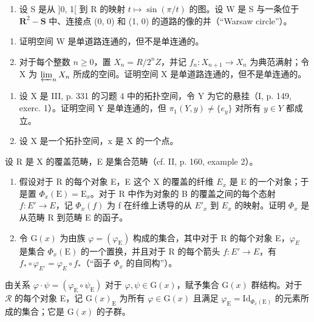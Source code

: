\exercisegroup

\begin{enumerate}
\def\labelenumi{\arabic{enumi})}
\tightlist
\item
设 S 是从 ]0, 1[ 到 R 的映射 \(t \mapsto \sin(\pi/t)\) 的图。设 W 是 S 与一条位于 \(\mathbf{R}^2 - \mathbf{S}\) 中、连接点 (0, 0) 和 (1, 0) 的道路的像的并（“Warsaw circle”）。
\end{enumerate}

\begin{enumerate}
\def\labelenumi{\alph{enumi})}
\item
证明空间 W 是单道路连通的，但不是单连通的。
\item
对于每个整数 \(n \geqslant 0\)，置 \(X_{n} = R/2^{n}Z\)，并记 \(f_{n}: X_{n+1} \to X_{n}\) 为典范满射；令 X 为 \(\varprojlim_{n} X_{n}\) 所成的空间。证明空间 X 是单道路连通的，但不是单连通的。
\end{enumerate}

\begin{enumerate}
\def\labelenumi{\arabic{enumi})}
\setcounter{enumi}{1}
\item
设 X 是 III, p. 331 的习题 4 中的拓扑空间，令 Y 为它的悬挂（I, p. 149, exerc. 1）。证明空间 Y 是单连通的，但 \(\pi_1(Y, y) \neq \{e_y\}\) 对所有 \(y \in Y\) 都成立。
\item
设 X 是一个拓扑空间，x 是 X 的一个点。
\end{enumerate}

设 R 是 X 的覆盖范畴，E 是集合范畴（cf. II, p. 160, example 2）。

\begin{enumerate}
\def\labelenumi{\alph{enumi})}
\item
假设对于 R 的每个对象 E，E 这个 X 的覆盖的纤维 \(E_{x}\) 是 E 的一个对象；于是置 \(\Phi_{x}(\mathrm{E}) = \mathrm{E}_{x}\)。对于 R 中作为对象的 B 的覆盖之间的每个态射 \(f: E' \to E\)，记 \(\Phi_{x}(f)\) 为 f 在纤维上诱导的从 \(E'_{x}\) 到 \(E_{x}\) 的映射。证明 \(\Phi_{x}\) 是从范畴 R 到范畴 E 的函子。
\item
令 \(\mathrm{G}(x)\) 为由族 \(\varphi = (\varphi_{\mathrm{E}})\) 构成的集合，其中对于 R 的每个对象 E，\(\varphi_{E}\) 是集合 \(\Phi_{x}(\mathrm{E})\) 的一个置换，并且对于 R 的每个箭头 \(f: E' \to E\)，有 \(f_{*} \circ \varphi_{E'} = \varphi_{E} \circ f_{*}\)（“函子 \(\Phi_{x}\) 的自同构”）。
\end{enumerate}

由关系 \(\varphi \cdot \psi = (\varphi_{\mathrm{E}} \circ \psi_{\mathrm{E}})\) 对于 \(\varphi, \psi \in \mathrm{G}(x)\)，赋予集合 \(\mathrm{G}(x)\) 群结构。对于 \(\mathcal{R}\) 的每个对象 E，记 \(\mathrm{G}(x)_{\mathrm{E}}\) 为所有 \(\varphi \in \mathrm{G}(x)\) 且满足 \(\varphi_{\mathrm{E}} = \mathrm{Id}_{\Phi_x(\mathrm{E})}\) 的元素所成的集合；它是 \(\mathrm{G}(x)\) 的子群。

